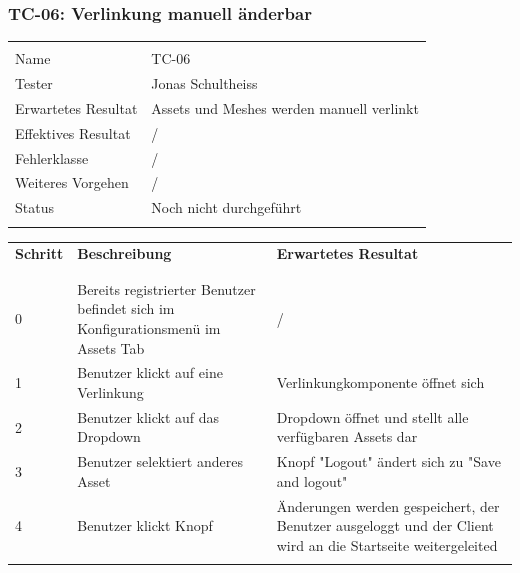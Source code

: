 \subsubsection{TC-06: Verlinkung manuell änderbar}
\begin{table}[H]
  \begin{tabularx}{\textwidth}{l X}\hline \\
  Name & TC-06 \\
  Tester & Jonas Schultheiss \\
  Erwartetes Resultat & Assets und Meshes werden manuell verlinkt \\
  Effektives Resultat & / \\
  Fehlerklasse & / \\
  Weiteres Vorgehen & / \\
  Status & Noch nicht durchgeführt \\
  \\\hline
  \end{tabularx}
\end{table}
\begin{table}[H]
  \begin{tabularx}{\textwidth}{l X X}
  \textbf{Schritt} & \textbf{Beschreibung} & \textbf{Erwartetes Resultat}\\ \\\hline \\
  0 & Bereits registrierter Benutzer befindet sich im Konfigurationsmenü im Assets Tab  & / \\
  1 & Benutzer klickt auf eine Verlinkung & Verlinkungkomponente öffnet sich \\
  2 & Benutzer klickt auf das Dropdown & Dropdown öffnet und stellt alle verfügbaren Assets dar \\
  3 & Benutzer selektiert anderes Asset & Knopf "Logout" ändert sich zu "Save and logout" \\
  4 & Benutzer klickt Knopf & Änderungen werden gespeichert, der Benutzer ausgeloggt und der Client wird an die Startseite weitergeleited \\
  \\\hline
  \end{tabularx}
\end{table}
\pagebreak
